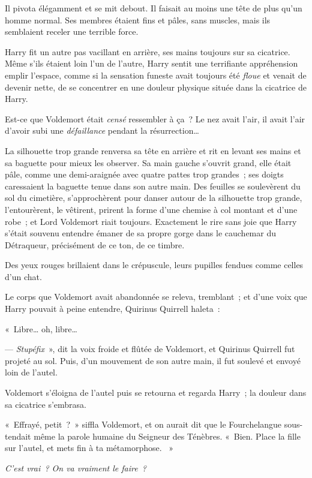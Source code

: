 Il pivota élégamment et se mit debout. Il faisait au moins une tête de plus qu'un homme normal. Ses membres étaient fins et pâles, sans muscles, mais ils semblaient receler une terrible force.

Harry fit un autre pas vacillant en arrière, ses mains toujours sur sa cicatrice. Même s'ils étaient loin l'un de l'autre, Harry sentit une terrifiante appréhension emplir l'espace, comme si la sensation funeste avait toujours été \emph{floue} et venait de devenir nette, de se concentrer en une douleur physique située dans la cicatrice de Harry.

Est-ce que Voldemort était \emph{censé} ressembler à ça~? Le nez avait l'air, il avait l'air d'avoir subi une \emph{défaillance} pendant la résurrection…

La silhouette trop grande renversa sa tête en arrière et rit en levant ses mains et sa baguette pour mieux les observer. Sa main gauche s'ouvrit grand, elle était pâle, comme une demi-araignée avec quatre pattes trop grandes~; ses doigts caressaient la baguette tenue dans son autre main. Des feuilles se soulevèrent du sol du cimetière, s'approchèrent pour danser autour de la silhouette trop grande, l'entourèrent, le vêtirent, prirent la forme d'une chemise à col montant et d'une robe~; et Lord Voldemort riait toujours. Exactement le rire sans joie que Harry s'était souvenu entendre émaner de sa propre gorge dans le cauchemar du Détraqueur, précisément de ce ton, de ce timbre.

Des yeux rouges brillaient dans le crépuscule, leurs pupilles fendues comme celles d'un chat.

Le corps que Voldemort avait abandonnée se releva, tremblant~; et d'une voix que Harry pouvait à peine entendre, Quirinus Quirrell haleta~:

«~Libre… oh, libre…

--- \emph{Stupéfix}~», dit la voix froide et flûtée de Voldemort, et Quirinus Quirrell fut projeté au sol. Puis, d'un mouvement de son autre main, il fut soulevé et envoyé loin de l'autel.

Voldemort s'éloigna de l'autel puis se retourna et regarda Harry~; la douleur dans sa cicatrice s'embrasa.

«~Effrayé, petit~?~» siffla Voldemort, et on aurait dit que le Fourchelangue sous-tendait même la parole humaine du Seigneur des Ténèbres. «~Bien. Place la fille sur l'autel, et mets fin à ta métamorphose. ~»

\emph{C'est vrai~? On va vraiment le faire~?}

